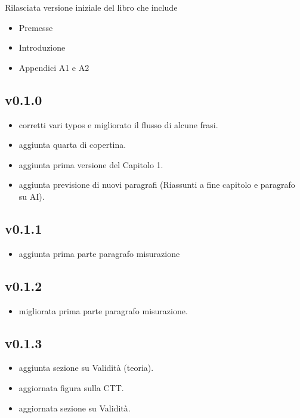 \documentclass[
  italian,
  letterpaper,
  paper=A4,
  headinclude=on,
  footinclude=on,
  12pt]{scrbook}
\providecommand{\tightlist}{%
  \setlength{\itemsep}{0pt}\setlength{\parskip}{0pt}}
\begin{document}
Rilasciata versione iniziale del libro che include

\begin{itemize}
\tightlist
\item
  Premesse
\item
  Introduzione
\item
  Appendici A1 e A2
\end{itemize}

\subsection*{v0.1.0}\label{v0.1.0}

\begin{itemize}
\tightlist
\item
  corretti vari typos e migliorato il flusso di alcune frasi.
\item
  aggiunta quarta di copertina.
\item
  aggiunta prima versione del Capitolo 1.
\item
  aggiunta previsione di nuovi paragrafi (Riassunti a fine capitolo e
  paragrafo su AI).
\end{itemize}

\subsection*{v0.1.1}\label{v0.1.1}

\begin{itemize}
\tightlist
\item
  aggiunta prima parte paragrafo misurazione
\end{itemize}

\subsection*{v0.1.2}\label{v0.1.2}

\begin{itemize}
\tightlist
\item
  migliorata prima parte paragrafo misurazione.
\end{itemize}

\subsection*{v0.1.3}\label{v0.1.3}

\begin{itemize}
\tightlist
\item
  aggiunta sezione su Validità (teoria).
\item
  aggiornata figura sulla CTT.
\item
  aggiornata sezione su Validità.
\end{itemize}
\end{document}
